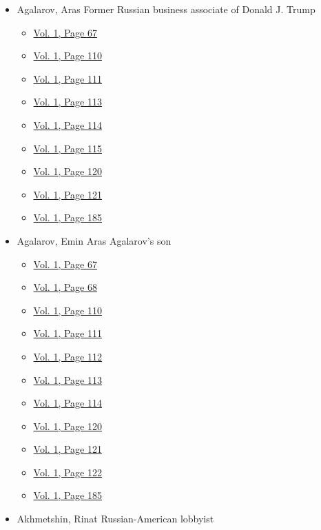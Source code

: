\begin{itemize}
\tightlist
\item
  Agalarov, Aras Former Russian business associate of Donald J. Trump

  \begin{itemize}
  \tightlist
  \item
    \protect\hyperlink{g-page-75}{Vol. 1, Page 67}
  \item
    \protect\hyperlink{g-page-118}{Vol. 1, Page 110}
  \item
    \protect\hyperlink{g-page-119}{Vol. 1, Page 111}
  \item
    \protect\hyperlink{g-page-121}{Vol. 1, Page 113}
  \item
    \protect\hyperlink{g-page-122}{Vol. 1, Page 114}
  \item
    \protect\hyperlink{g-page-123}{Vol. 1, Page 115}
  \item
    \protect\hyperlink{g-page-128}{Vol. 1, Page 120}
  \item
    \protect\hyperlink{g-page-129}{Vol. 1, Page 121}
  \item
    \protect\hyperlink{g-page-193}{Vol. 1, Page 185}
  \end{itemize}
\item
  Agalarov, Emin Aras Agalarov's son

  \begin{itemize}
  \tightlist
  \item
    \protect\hyperlink{g-page-75}{Vol. 1, Page 67}
  \item
    \protect\hyperlink{g-page-76}{Vol. 1, Page 68}
  \item
    \protect\hyperlink{g-page-118}{Vol. 1, Page 110}
  \item
    \protect\hyperlink{g-page-119}{Vol. 1, Page 111}
  \item
    \protect\hyperlink{g-page-120}{Vol. 1, Page 112}
  \item
    \protect\hyperlink{g-page-121}{Vol. 1, Page 113}
  \item
    \protect\hyperlink{g-page-122}{Vol. 1, Page 114}
  \item
    \protect\hyperlink{g-page-128}{Vol. 1, Page 120}
  \item
    \protect\hyperlink{g-page-129}{Vol. 1, Page 121}
  \item
    \protect\hyperlink{g-page-130}{Vol. 1, Page 122}
  \item
    \protect\hyperlink{g-page-193}{Vol. 1, Page 185}
  \end{itemize}
\item
  Akhmetshin, Rinat Russian-American lobbyist


\end{itemize}
